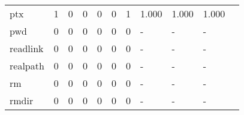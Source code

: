 \begin{longtable}{lp{1.20cm}p{1.20cm}p{1.20cm}p{1.20cm}p{1.20cm}p{1.20cm}p{1.20cm}p{1.20cm}p{1.20cm}p{1.20cm}}
ptx       &                                     1 &                                                  0 &                                                  0 &                                                  0 &                                                  0 &                                                  1 &                                         1.000 &                                              1.000 &                                              1.000 \\
pwd       &                                     0 &                                                  0 &                                                  0 &                                                  0 &                                                  0 &                                                  0 &                                             - &                                                  - &                                                  - \\
readlink  &                                     0 &                                                  0 &                                                  0 &                                                  0 &                                                  0 &                                                  0 &                                             - &                                                  - &                                                  - \\
realpath  &                                     0 &                                                  0 &                                                  0 &                                                  0 &                                                  0 &                                                  0 &                                             - &                                                  - &                                                  - \\
rm        &                                     0 &                                                  0 &                                                  0 &                                                  0 &                                                  0 &                                                  0 &                                             - &                                                  - &                                                  - \\
rmdir     &                                     0 &                                                  0 &                                                  0 &                                                  0 &                                                  0 &                                                  0 &                                             - &                                                  - &                                                  - \\

\end{longtable}

